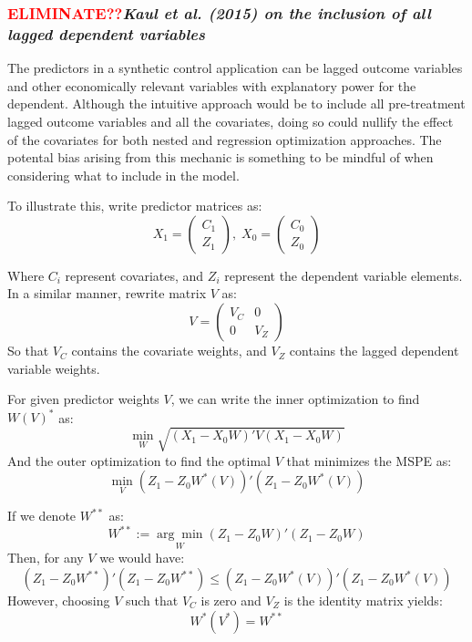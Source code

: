 \documentclass[12pt,a4paper,draft]{article}
\begin{document}
\subsubsection*{\textcolor{red}{ELIMINATE??}\textit{Kaul et al. (2015) on the inclusion of all lagged dependent variables}}
The predictors in a synthetic control application can be lagged outcome variables and other 
economically relevant variables with explanatory power for the dependent. Although 
the intuitive approach would be to include all pre-treatment lagged outcome 
variables and all the covariates, doing so could nullify the effect of the covariates 
for both nested and regression optimization approaches. The potental bias arising 
from this mechanic is something to be mindful of when considering what to include 
in the model.

To illustrate this, write predictor matrices as:
\begin{equation}
    X_1 = \left( \begin{matrix} C_1 \\ Z_1 \end{matrix} \right), \;
    X_0 = \left( \begin{matrix} C_0 \\ Z_0 \end{matrix} \right)
\end{equation}

Where $C_i$ represent covariates, and $Z_i$ represent the dependent variable elements.
In a similar manner, rewrite matrix $V$ as:
\begin{equation}
    V = \begin{pmatrix}
        V_C & 0 \\
        0 & V_Z
    \end{pmatrix}
\end{equation}
So that $V_C$ contains the covariate weights, and $V_Z$ contains the lagged dependent 
variable weights.

For given predictor weights $V$, we can write the inner optimization to find $W(V)^*$ as:
\begin{equation}
    \min_{W} \sqrt{(X_1-X_0 W)' V (X_1-X_0 W)}
\end{equation}
And the outer optimization to find the optimal $V$ that minimizes the MSPE as:
\begin{equation}
    \min_V (Z_1 - Z_0  W^*(V))' (Z_1 - Z_0 W^*(V))
\end{equation}

If we denote $W^{**}$ as:
\begin{equation}
    W^{**} := \underset{W}{\arg\min}  (Z_1 -Z_0 W)' (Z_1-Z_0 W) 
\end{equation}
Then, for any $V$ we would have:
\begin{equation}
    (Z_1-Z_0 W^{**})' (Z_1-Z_0 W^{**}) \le (Z_1 - Z_0  W^*(V))' (Z_1 - Z_0 W^*(V))
\end{equation}
However, choosing $V$ such that $V_C$ is zero and $V_Z$ is the identity matrix yields:
\begin{equation}
    W^* (V^*) = W^{**}
\end{equation}
\end{document}
